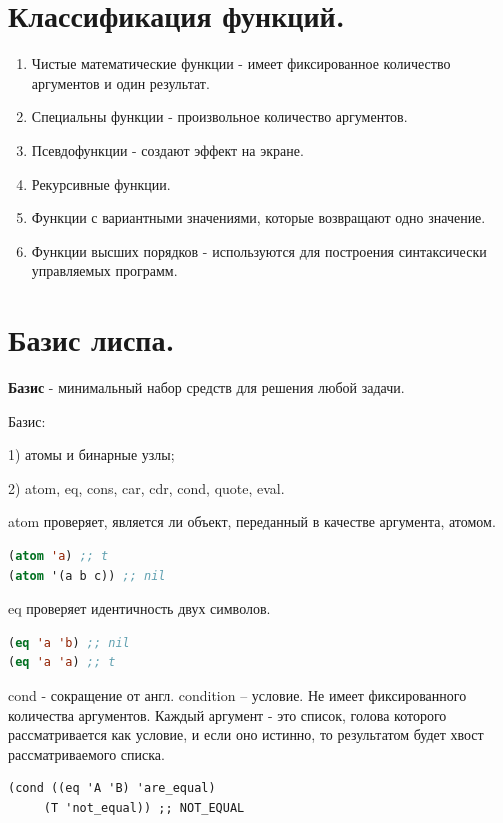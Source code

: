 \section{Классификация функций.}

\begin{enumerate}
	\item Чистые математические функции - имеет фиксированное количество аргументов и один результат.
	\item Специальны функции - произвольное количество аргументов.
	\item Псевдофункции - создают эффект на экране.
	\item Рекурсивные функции.
	\item Функции с вариантными значениями, которые возвращают одно значение.
	\item Функции высших порядков - используются для построения синтаксически управляемых программ. %
\end{enumerate}

\section{Базис лиспа.}

\textbf{Базис} - минимальный набор средств для решения любой задачи.

Базис:

1) атомы и бинарные узлы;

2) atom, eq, cons, car, cdr, cond, quote, eval.

atom проверяет, является ли объект, переданный в качестве аргумента, атомом.

\begin{lstlisting}[language=Lisp]
(atom 'a) ;; t
(atom '(a b c)) ;; nil
\end{lstlisting}

eq проверяет идентичность двух символов.
\begin{lstlisting}[language=Lisp]
(eq 'a 'b) ;; nil
(eq 'a 'a) ;; t
\end{lstlisting}
	
cond - сокращение от англ. condition – условие. 
Не имеет фиксированного количества аргументов.
Каждый аргумент - это список, голова которого рассматривается как условие, 
и если оно истинно, то результатом будет хвост рассматриваемого списка.

\begin{lstlisting}
(cond ((eq 'A 'B) 'are_equal)
	 (T 'not_equal)) ;; NOT_EQUAL
\end{lstlisting}

